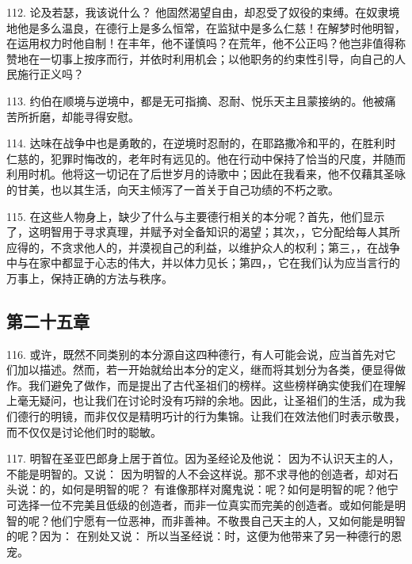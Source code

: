 112. 论及若瑟，我该说什么？ 他固然渴望自由，却忍受了奴役的束缚。在奴隶境地他是多么温良，在德行上是多么恒常，在监狱中是多么仁慈！在解梦时他明智，在运用权力时他自制！在丰年，他不谨慎吗？在荒年，他不公正吗？他岂非值得称赞地在一切事上按序而行，并依时利用机会；以他职务的约束性引导，向自己的人民施行正义吗？\par

113. 约伯在顺境与逆境中，都是无可指摘、忍耐、悦乐天主且蒙接纳的。他被痛苦所折磨，却能寻得安慰。\par

114. 达味在战争中也是勇敢的，在逆境时忍耐的，在耶路撒冷和平的，在胜利时仁慈的，犯罪时悔改的，老年时有远见的。他在行动中保持了恰当的尺度，并随而利用时机。他将这一切记在了后世岁月的诗歌中；因此在我看来，他不仅藉其圣咏的甘美，也以其生活，向天主倾泻了一首关于自己功绩的不朽之歌。\par

115. 在这些人物身上，缺少了什么与主要德行相关的本分呢？首先，他们显示了，这明智用于寻求真理，并赋予对全备知识的渴望；其次，，它分配给每人其所应得的，不贪求他人的，并漠视自己的利益，以维护众人的权利；第三，，在战争中与在家中都显于心志的伟大，并以体力见长；第四，，它在我们认为应当言行的万事上，保持正确的方法与秩序。\par


\subsection{第二十五章}

\par

116. 或许，既然不同类别的本分源自这四种德行，有人可能会说，应当首先对它们加以描述。然而，若一开始就给出本分的定义，继而将其划分为各类，便显得做作。我们避免了做作，而是提出了古代圣祖们的榜样。这些榜样确实使我们在理解上毫无疑问，也让我们在讨论时没有巧辩的余地。因此，让圣祖们的生活，成为我们德行的明镜，而非仅仅是精明巧计的行为集锦。让我们在效法他们时表示敬畏，而不仅仅是讨论他们时的聪敏。\par

117. 明智在圣亚巴郎身上居于首位。因为圣经论及他说： 因为不认识天主的人，不能是明智的。又说： 因为明智的人不会这样说。那不求寻他的创造者，却对石头说：的，如何是明智的呢？ 有谁像那样对魔鬼说：呢？如何是明智的呢？他宁可选择一位不完美且低级的创造者，而非一位真实而完美的创造者。或如何能是明智的呢？他们宁愿有一位恶神，而非善神。不敬畏自己天主的人，又如何能是明智的呢？因为： 在别处又说： 所以当圣经说：时，这便为他带来了另一种德行的恩宠。\par

